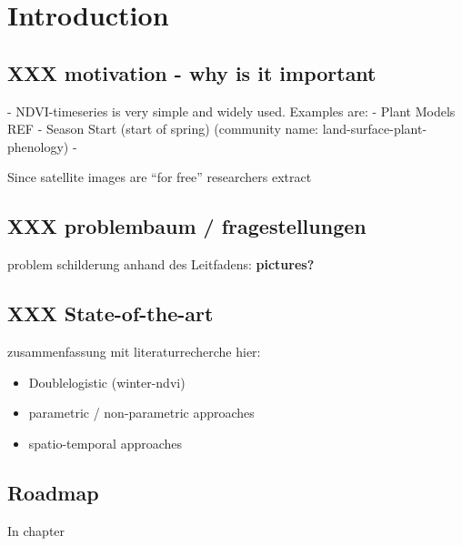 \chapter{Introduction}

\section{XXX motivation - why is it important}{
    - NDVI-timeseries is very simple and widely used. 
        Examples are: 
            - Plant Models REF
            - Season Start (start of spring) (community name: land-surface-plant-phenology)
            - 
    
    Since satellite images are ``for free'' researchers extract 
}


\section{XXX problembaum / fragestellungen}{
    problem schilderung anhand des Leitfadens:
    \textbf{pictures?}
}



\section{XXX State-of-the-art}{
    zusammenfassung mit literaturrecherche hier:
    \begin{itemize}
        \item Doublelogistic (winter-ndvi)
        \item parametric / non-parametric approaches
        \item spatio-temporal approaches
    \end{itemize}
}


\section{Roadmap}{
    In chapter
}


